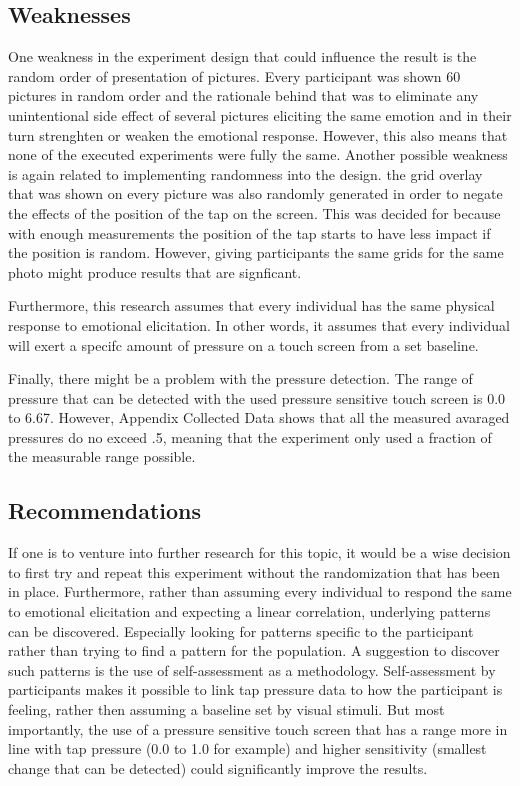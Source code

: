 \documentclass{sigchi}
\begin{document}
\subsection{Weaknesses}
One weakness in the experiment design that could influence the result is the random order of presentation of pictures. Every participant was shown 60 pictures in random order and the rationale behind that was to eliminate any unintentional side effect of several pictures eliciting the same emotion and in their turn strenghten or weaken the emotional response. However, this also means that none of the executed experiments were fully the same. Another possible weakness is again related to implementing randomness into the design. the grid overlay that was shown on every picture was also randomly generated in order to negate the effects of the position of the tap on the screen. This was decided for because with enough measurements the position of the tap starts to have less impact if the position is random. However, giving participants the same grids for the same photo might produce results that are signficant.

Furthermore, this research assumes that every individual has the same physical response to emotional elicitation. In other words, it assumes that every individual will exert a specifc amount of pressure on a touch screen from a set baseline.

Finally, there might be a problem with the pressure detection. The range of pressure that can be detected with the used pressure sensitive touch screen is 0.0 to 6.67. However, Appendix Collected Data shows that all the measured avaraged pressures do no exceed .5, meaning that the experiment only used a fraction of the measurable range possible.

\subsection{Recommendations} %
\label{sub:recommendations}
If one is to venture into further research for this topic, it would be a wise decision to first try and repeat this experiment without the randomization that has been in place. Furthermore, rather than assuming every individual to respond the same to emotional elicitation and expecting a linear correlation, underlying patterns can be discovered. Especially looking for patterns specific to the participant rather than trying to find a pattern for the population. A suggestion to discover such patterns is the use of self-assessment as a methodology. Self-assessment by participants makes it possible to link tap pressure data to how the participant is feeling, rather then assuming a baseline set by visual stimuli. But most importantly, the use of a pressure sensitive touch screen that has a range more in line with tap pressure (0.0 to 1.0 for example) and higher sensitivity (smallest change that can be detected) could significantly improve the results.
\end{document}
